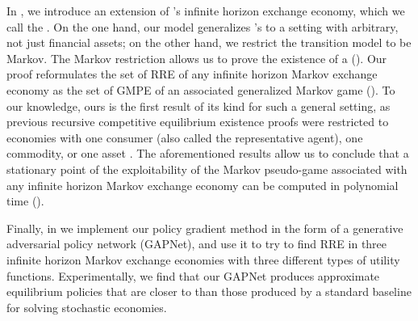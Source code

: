 In , we introduce an extension of \citet{magill1994infinite}'s infinite horizon exchange economy, which we call the . 
On the one hand, our model generalizes \citeauthor{magill1994infinite}'s to a setting with arbitrary, not just financial assets; on the other hand, we restrict the transition model to be Markov.
The Markov restriction allows us to prove the existence of a  \cite{mehra1977recursive} ().
Our proof reformulates the set of RRE of any infinite horizon Markov exchange economy as the set of GMPE of an associated generalized Markov game ().
To our knowledge, ours is the first result of its kind for such a general setting, as previous recursive competitive equilibrium existence proofs were restricted to economies with one consumer (also called the representative agent), one commodity, or one asset \cite{mehra1977recursive, prescott1980recursive}. 
The aforementioned results allow us to conclude that a stationary point of the exploitability of the Markov pseudo-game associated with any infinite horizon Markov exchange economy can be computed in polynomial time ().

Finally, in  we implement our policy gradient method in the form of a generative adversarial policy network (GAPNet), and use it to try to find RRE in three infinite horizon Markov exchange economies with three different types of utility functions.
Experimentally, we find that our GAPNet produces approximate equilibrium policies that are closer to \MPGNE{} than those produced by a standard baseline for solving stochastic economies.
